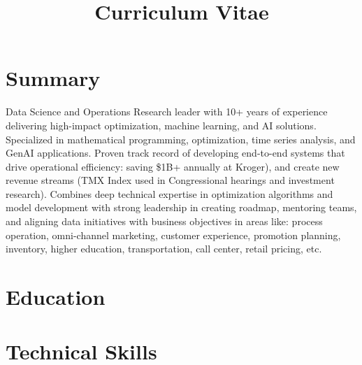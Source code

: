 \documentclass[12pt,a4paper,sans]{moderncv}
\title{Curriculum Vitae}
\begin{document}
\setlength{\parskip}{1em}
\makecvtitle


\section{Summary}
Data Science and Operations Research leader with 10+ years of experience delivering high-impact optimization, machine learning, and AI solutions. Specialized in mathematical programming, optimization, time series analysis, and GenAI applications. Proven track record of developing end-to-end systems that drive operational efficiency: saving \$1B+ annually at Kroger), and create new revenue streams (TMX Index used in Congressional hearings and investment research). Combines deep technical expertise in optimization algorithms and model development with strong leadership in creating roadmap, mentoring teams, and aligning data initiatives with business objectives in areas like: process operation, omni-channel marketing, customer experience, promotion planning, inventory, higher education, transportation, call center, retail pricing, etc.  
\section{Education}

\section{Technical Skills}
\end{document}
